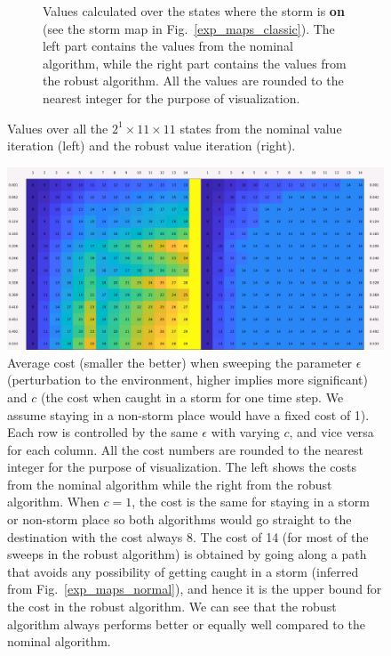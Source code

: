 \documentclass[11pt,reqno]{amsart}
\theoremstyle{definition}
\numberwithin{equation}{section}
\theoremstyle{remark}
\begin{document}
\begin{figure}
\begin{subfigure}{1\linewidth}
    \caption{Values calculated over the states where the storm is \textbf{on} (see the storm map in Fig.~\ref{exp_maps_classic}). The left part contains the values from the nominal algorithm, while the right part contains the values from the robust algorithm. All the values are rounded to the nearest integer for the purpose of visualization.}
    \label{exp_values_storm}
\end{subfigure}
\caption{Values over all the $2^1 \times 11 \times 11$ states from the nominal value iteration (left) and the robust value iteration (right).}
\label{exp_values}
\end{figure}

\begin{figure}
    \centering
    \includegraphics[width=0.99\linewidth]{images/matrix_normal.png}
\caption{Average cost (smaller the better) when sweeping the parameter $\epsilon$ (perturbation to the environment, higher implies more significant) and $c$ (the cost when caught in a storm for one time step. We assume staying in a non-storm place would have a fixed cost of 1). Each row is controlled by the same $\epsilon$ with varying $c$, and vice versa for each column. All the cost numbers are rounded to the nearest integer for the purpose of visualization. The left shows the costs from the nominal algorithm while the right from the robust algorithm. When $c=1$, the cost is the same for staying in a storm or non-storm place so both algorithms would go straight to the destination with the cost always 8. The cost of 14 (for most of the sweeps in the robust algorithm) is obtained by going along a path that avoids any possibility of getting caught in a storm (inferred from Fig.~\ref{exp_maps_normal}), and hence it is the upper bound for the cost in the robust algorithm. We can see that the robust algorithm always performs better or equally well compared to the nominal algorithm.}
\label{exp_matrix_normal}
\end{figure}
\end{document}
